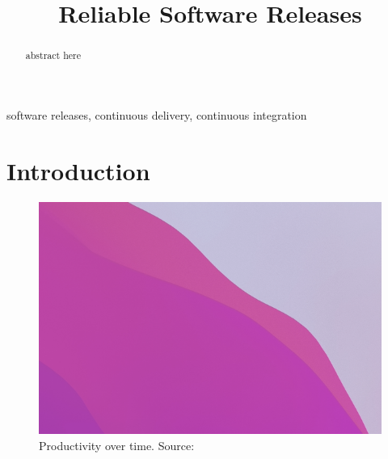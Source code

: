 \documentclass[conference]{IEEEtran}
\begin{document}
\title{Reliable Software Releases}

\author{
\and
{}
}

\maketitle

\begin{abstract}
abstract here
\end{abstract}

\begin{IEEEkeywords}
software releases, continuous delivery, continuous integration
\end{IEEEkeywords}

\section{Introduction}

\begin{figure}[!ht]
    \centering
    \includegraphics[scale=0.5]{images/1.png}
    \caption{Productivity over time. Source: \cite[S.4]{HumbleFarley10}}
    \label{fig:productivity}
\end{figure}
\end{document}

